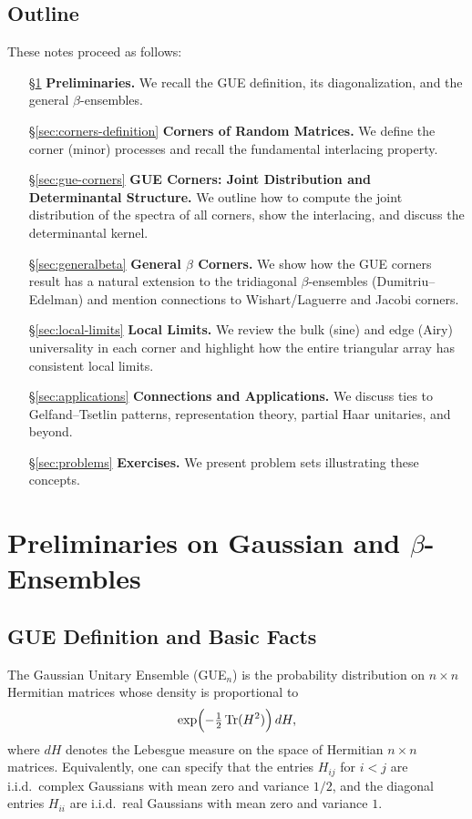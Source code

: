 \documentclass[letterpaper,11pt,oneside,reqno]{article}
\numberwithin{equation}{section}
\theoremstyle{definition}
\begin{document}
\subsection{Outline}
These notes proceed as follows:
\begin{itemize}
\item[\S\ref{sec:preliminaries}] \textbf{Preliminaries.} We recall the GUE definition, its diagonalization, and the general $\beta$-ensembles. 
\item[\S\ref{sec:corners-definition}] \textbf{Corners of Random Matrices.} We define the corner (minor) processes and recall the fundamental interlacing property.
\item[\S\ref{sec:gue-corners}] \textbf{GUE Corners: Joint Distribution and Determinantal Structure.} We outline how to compute the joint distribution of the spectra of all corners, show the interlacing, and discuss the determinantal kernel. 
\item[\S\ref{sec:generalbeta}] \textbf{General $\beta$ Corners.} We show how the GUE corners result has a natural extension to the tridiagonal $\beta$-ensembles (Dumitriu--Edelman) and mention connections to Wishart/Laguerre and Jacobi corners. 
\item[\S\ref{sec:local-limits}] \textbf{Local Limits.} We review the bulk (sine) and edge (Airy) universality in each corner and highlight how the entire triangular array has consistent local limits. 
\item[\S\ref{sec:applications}] \textbf{Connections and Applications.} We discuss ties to Gelfand--Tsetlin patterns, representation theory, partial Haar unitaries, and beyond.
\item[\S\ref{sec:problems}] \textbf{Exercises.} We present problem sets illustrating these concepts. 
\end{itemize}

\section{Preliminaries on Gaussian and $\beta$-Ensembles}
\label{sec:preliminaries}

\subsection{GUE Definition and Basic Facts}
The Gaussian Unitary Ensemble (GUE$_n$) is the probability distribution on $n\times n$ Hermitian matrices whose density is proportional to
\[
	\exp\Bigl(-\tfrac{1}{2}\,\mathrm{Tr}(H^2)\Bigr)\,dH,
\]
where $dH$ denotes the Lebesgue measure on the space of Hermitian $n\times n$ matrices. Equivalently, one can specify that the entries $H_{ij}$ for $i<j$ are i.i.d.\ complex Gaussians with mean zero and variance $1/2$, and the diagonal entries $H_{ii}$ are i.i.d.\ real Gaussians with mean zero and variance $1$.
\end{document}
